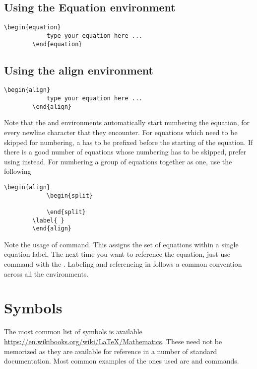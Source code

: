 \subsection{Using the Equation environment}
\begin{lstlisting}[frame=single]
		\begin{equation}
			type your equation here ... 
		\end{equation}
\end{lstlisting}
\subsection{Using the align environment}
\begin{lstlisting}[frame=single]
		\begin{align}
			type your equation here ...
		\end{align}
\end{lstlisting}
Note that the  and  environments automatically start numbering the equation, for every newline character that they encounter. For equations which need to be skipped for numbering, a \tet{\nonumber} has to be prefixed before the starting of the equation. If there is a good number of equations whose numbering has to be skipped, prefer using  instead. For numbering a group of equations together as one, use the following 
\begin{lstlisting}[frame=single]
		\begin{align}
			\begin{split} 
			
			\end{split}
		\label{ }
		\end{align}
\end{lstlisting}
Note the usage of  command. This assigns the set of equations within  a single equation label. The next time you want to reference the equation, just use  command with the . Labeling and referencing in \latex follows a common convention across all the environments. 
\section{Symbols}
The most common list of symbols is available \url{https://en.wikibooks.org/wiki/LaTeX/Mathematics}. These need not be memorized as they are available for reference in a number of standard  documentation. Most common examples of the ones used are  and  commands. 
